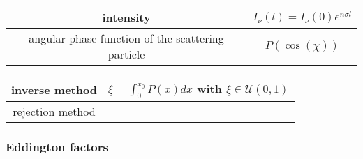\documentclass[../main/main.tex]{subfiles}
\begin{document}
\begin{center}
\centering
{\tabulinesep=1.5mm
\begin{tabu}{|c|c|}
\hline 
intensity & $I_{\nu}(l) = I_{\nu}(0)e^{n \sigma l}$ \\ \hline
angular phase function of the scattering particle & $P(\cos(\chi))$ \\ \hline

\end{tabu}}
\end{center}

\begin{center}
\centering
{\tabulinesep=1.5mm
\begin{tabu}{|c|c|}
\hline 
inverse method & $\xi = \int_0 ^{x_0} P(x) dx $ with $\xi \in \mathcal{U}(0,1)$ \\ \hline

rejection method & \\ \hline
\end{tabu}}
\end{center}

\subsubsection{Eddington factors}
\end{document}
